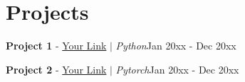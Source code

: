 \section{Projects}
\resumeSubHeadingListStart

\resumeProjectHeading
    {\textbf{Project 1}  - \textcolor{MidnightBlue} {\href{https://xxx.com}{Your Link}} $|$ \emph{Python}}{Jan 20xx - Dec 20xx}
    \resumeItemListStart
    \resumeItemListEnd
    
\resumeProjectHeading
    {\textbf{Project 2}  - \textcolor{MidnightBlue} {\href{https://xxx.com}{Your Link}} $|$ \emph{Pytorch}}{Jan 20xx - Dec 20xx}
    \resumeItemListStart
    \resumeItemListEnd
    
\resumeSubHeadingListEnd
